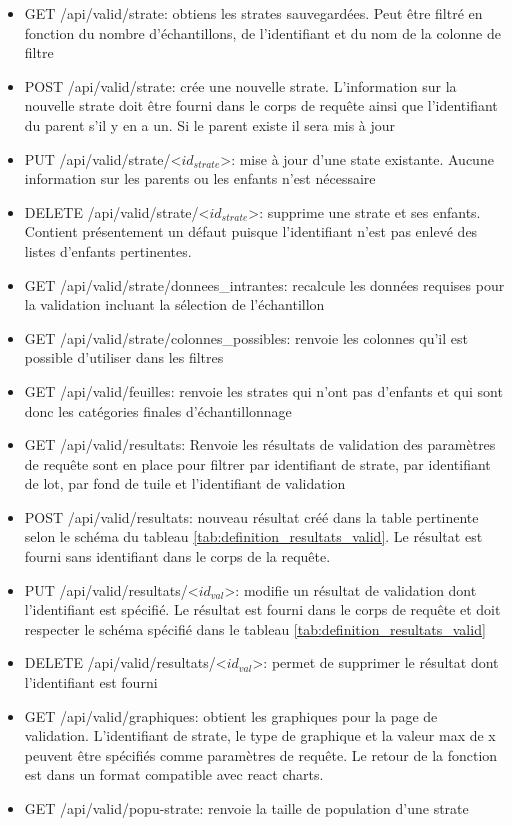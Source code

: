 \begin{itemize}
    \item GET /api/valid/strate: obtiens les strates sauvegardées. Peut être filtré en fonction du nombre d'échantillons, de l'identifiant et du nom de la colonne de filtre
    \item  POST /api/valid/strate: crée une nouvelle strate. L'information sur la nouvelle strate doit être fourni dans le corps de requête ainsi que l'identifiant du parent s'il y en a un. Si le parent existe il sera mis à jour
    \item PUT /api/valid/strate/<$id_{strate}$>: mise à jour d'une state existante. Aucune information sur les parents ou les enfants n'est nécessaire
    \item DELETE /api/valid/strate/<$id_{strate}$>: supprime une strate et ses enfants. Contient présentement un défaut puisque l'identifiant n'est pas enlevé des listes d'enfants pertinentes.
    \item GET /api/valid/strate/donnees\_intrantes: recalcule les données requises pour la validation incluant la sélection de l'échantillon
    \item GET /api/valid/strate/colonnes\_possibles: renvoie les colonnes qu'il est possible d'utiliser dans les filtres
    \item GET /api/valid/feuilles: renvoie les strates qui n'ont pas d'enfants et qui sont donc les catégories finales d'échantillonnage
    \item GET /api/valid/resultats: Renvoie les résultats de validation des paramètres de requête sont en place pour filtrer par identifiant de strate, par identifiant de lot, par fond de tuile et l'identifiant de validation
    \item POST /api/valid/resultats: nouveau résultat créé dans la table pertinente selon le schéma du tableau \ref{tab:definition_resultats_valid}. Le résultat est fourni sans identifiant dans le corps de la requête.
    \item PUT /api/valid/resultats/<$id_{val}$>: modifie un résultat de validation dont l'identifiant est spécifié. Le résultat est fourni dans le corps de requête et doit respecter le schéma spécifié dans le tableau \ref{tab:definition_resultats_valid}
    \item DELETE /api/valid/resultats/<$id_{val}$>: permet de supprimer le résultat dont l'identifiant est fourni
    \item GET /api/valid/graphiques: obtient les graphiques pour la page de validation. L'identifiant de strate, le type de graphique et la valeur max de x peuvent être spécifiés comme paramètres de requête. Le retour de la fonction est dans un format compatible avec react charts.
    \item GET /api/valid/popu-strate: renvoie la taille de population d'une strate 
\end{itemize}
\clearpage

